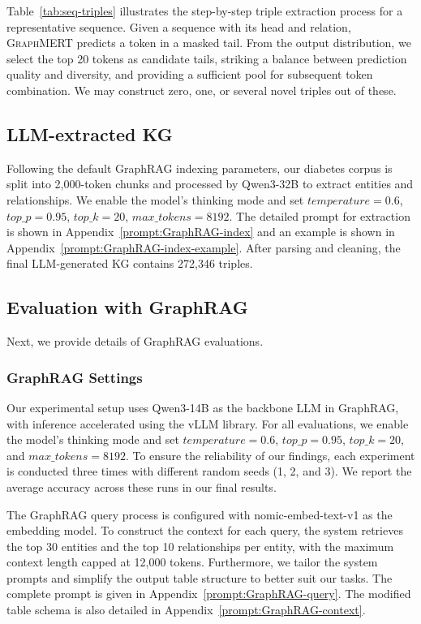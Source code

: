 \documentclass[10pt]{article}
\newcommand{\ours}{\textsc{GraphMERT}\xspace}
\begin{document}
Table~\ref{tab:seq-triples} illustrates the step-by-step triple extraction process for a representative sequence. Given a sequence with its head and relation, \ours predicts a token in a masked tail. From the output distribution, we select the top 20 tokens as candidate tails, striking a balance between prediction quality and diversity, and providing a sufficient pool for subsequent token combination. We may construct zero, one, or several novel triples out of these.

\subsection{LLM-extracted KG}
\label{subsec:llm_extracted_kg}
Following the default GraphRAG indexing parameters, our diabetes corpus is split into 2,000-token chunks and processed by Qwen3-32B to extract entities and relationships. We enable the model's thinking mode and set $temperature= 0.6$, $top\_p=0.95$, $top\_k=20$, $max\_tokens=8192$. The detailed prompt for extraction is shown in Appendix~\ref{prompt:GraphRAG-index} and an example is shown in Appendix~\ref{prompt:GraphRAG-index-example}. After parsing and cleaning, the final LLM-generated KG contains 272,346 triples.

\subsection{Evaluation with GraphRAG}
\label{evaluation_graphrag}

Next, we provide details of GraphRAG evaluations.

\subsubsection{GraphRAG Settings} 
Our experimental setup uses Qwen3-14B as the backbone LLM in GraphRAG, with inference accelerated using the vLLM library. For all evaluations, we enable the model's thinking mode and set $temperature= 0.6$, $top\_p=0.95$, $top\_k=20$, and $max\_tokens=8192$. To ensure the reliability of our findings, each experiment is conducted three times with different random seeds (1, 2, and 3). We report the average accuracy across these runs in our final results.

The GraphRAG query process is configured with nomic-embed-text-v1 as the embedding model. To construct the context for each query, the system retrieves the top 30 entities and the top 10 relationships per entity, with the maximum context length capped at 12,000 tokens. Furthermore, we tailor the system prompts and simplify the output table structure to better suit our tasks. The complete prompt is given in Appendix~\ref{prompt:GraphRAG-query}. The modified table schema is also detailed in Appendix~\ref{prompt:GraphRAG-context}.
\end{document}
